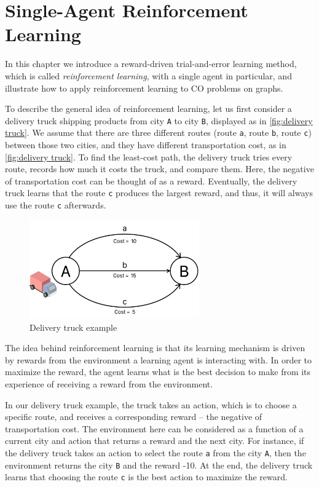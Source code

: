 \chapter{Single-Agent Reinforcement Learning}
\label{chap:Reinforcement Learning}
\vspace{1cm}

In this chapter we introduce a reward-driven trial-and-error learning method, which is called \textit{reinforcement learning}, with a single agent in particular, and illustrate how to apply reinforcement learning to CO problems on graphs.

To describe the general idea of reinforcement learning, let us first consider a delivery truck shipping products from city \texttt{A} to city \texttt{B}, displayed as in \autoref{fig:delivery truck}. We assume that there are three different routes (route \texttt{a}, route \texttt{b}, route \texttt{c}) between those two cities, and they have different transportation cost, as in \autoref{fig:delivery truck}. To find the least-cost path, the delivery truck tries every route, records how much it costs the truck, and compare them. Here, the negative of transportation cost can be thought of as a reward. Eventually, the delivery truck learns that the route \texttt{c} produces the largest reward, and thus, it will always use the route \texttt{c} afterwards.
\begin{figure}[hbt!]
    \centering
    \includegraphics[width=0.65\textwidth]{figures/Reinforcement/truck.png}
    \captionsetup{justification=centering}
    \caption{Delivery truck example}
    \label{fig:delivery truck}
\end{figure}

The idea behind reinforcement learning is that its learning mechanism is driven by rewards from the environment a learning agent is interacting with. In order to maximize the reward, the agent learns what is the best decision to make from its experience of receiving a reward from the environment.

In our delivery truck example, the truck takes an action, which is to choose a specific route, and receives a corresponding reward -- the negative of transportation cost. The environment here can be considered as a function of a current city and action that returns a reward and the next city. For instance, if the delivery truck takes an action to select the route \texttt{a} from the city \texttt{A}, then the environment returns the city \texttt{B} and the reward -10. At the end, the delivery truck learns that choosing the route \texttt{c} is the best action to maximize the reward.

